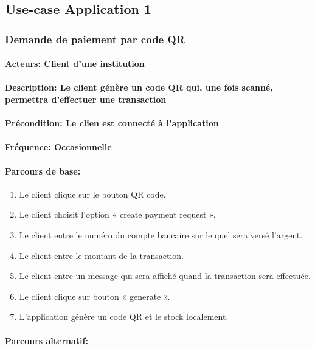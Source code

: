\documentclass[../annexe.tex]{subfiles}
\begin{document}
\subsection{Use-case Application 1}


    \subsubsection{Demande de paiement par code QR} 

        \paragraph{Acteurs: Client d’une institution}
        \paragraph{Description: Le client génère un code QR qui, une fois scanné, permettra d’effectuer une transaction}
        \paragraph{Précondition: Le clien est connecté à l’application}
        \paragraph{Fréquence: Occasionnelle}
        \paragraph{Parcours de base:} 
        \begin{enumerate}
        \item  Le client clique sur le bouton QR code.
        \item  Le client choisit l’option «  create payment request ».
        \item  Le client entre le numéro du compte bancaire sur le quel sera versé l’argent.
        \item  Le client entre le montant de la transaction.
        \item  Le client entre un message qui sera affiché quand la transaction sera effectuée.
        \item  Le client clique sur bouton « generate ».
        \item  L’application génère un code QR et le stock localement. 
        \end{enumerate}
            \paragraph{Parcours alternatif:\  } 
\end{document}
